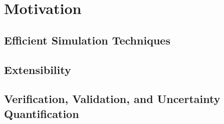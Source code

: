 \chapter{Motivation}

\section{Efficient Simulation Techniques}
\section{Extensibility}
\section{Verification, Validation, and Uncertainty Quantification}